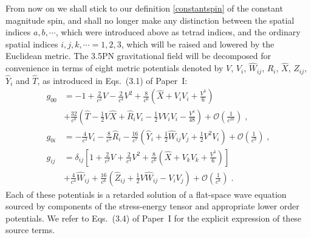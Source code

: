 \documentclass[
superscriptaddress,
preprint,
prd,tightenlines,showpacs,nofootinbib,
eqsecnum,
amsfonts,amsmath,amssymb]{revtex4-1}
\newcommand{\calO}{\mathcal{O}}
\begin{document}
From now on we shall stick to our definition \eqref{constantspin} of
the constant magnitude spin, and shall no longer make any distinction
between the spatial indices $a,b,\cdots$, which were introduced above as
tetrad indices, and the ordinary spatial indices
$i,j,k,\cdots=1,2,3$, which will be raised and lowered by the Euclidean metric. 
The 3.5PN gravitational field will be decomposed for convenience in terms of
eight metric 
potentials denoted by $V$, $V_i$, $\hat{W}_{ij}$, $\hat{R}_{i}$,
$\hat{X}$, $\hat{Z}_{ij}$, $\hat{Y}_i$ and $\hat{T}$, as introduced
in Eqs.~(3.1) of Paper~I: 
%
\begin{subequations}\label{metricg}
\begin{align} g_{00}
 &=  -1 + \frac{2}{c^{2}}V - \frac{2}{c^{4}} V^{2} + \frac{8}{c^{6}}
\left(\hat{X} + V_{i} V_{i} + \frac{V^{3}}{6}\right)\nonumber\\ & +
\frac{32}{c^{8}} \left(\hat{T} - \frac{1}{2} V \hat{X} + \hat{R}_{i} V_{i} -
\frac{1}{2} V V_{i} V_{i} -
\frac{V^{4}}{48}\right)+\calO\left(\frac{1}{c^{10}}
\right)\;,\\ 
g_{0i} & = - \frac{4}{c^{3}}
V_{i} - \frac{8}{c^{5}} \hat{R}_{i} - \frac{16}{c^{7}} \left(\hat{Y}_{i} +
\frac{1}{2}\hat{W}_{ij} V_{j} + \frac{1}{2} V^{2} V_{i}\right) +
\calO\left(\frac{1}{c^9}\right)\;,\\ 
g_{ij} & = \delta_{ij} \left[1 +
\frac{2}{c^{2}}V + \frac{2}{c^{4}} V^{2} + \frac{8}{c^{6}} \left(\hat{X} +
V_{k} V_{k} + \frac{V^{3}}{6}\right)\right] \nonumber\\ & +
\frac{4}{c^{4}}\hat{W}_{ij} + \frac{16}{c^{6}} \left( \hat{Z}_{ij} + \frac{1}{2} V
\hat{W}_{ij} - V_{i} V_{j} \right) + \calO\left(\frac{1}{c^8}\right) \;.
\end{align}
\end{subequations}
%
Each of these potentials is a retarded solution of a flat-space wave equation
sourced by components of the stress-energy tensor and appropriate lower
order potentials. We refer to Eqs.~(3.4) of Paper~I for the explicit expression
of these source terms.
\end{document}
